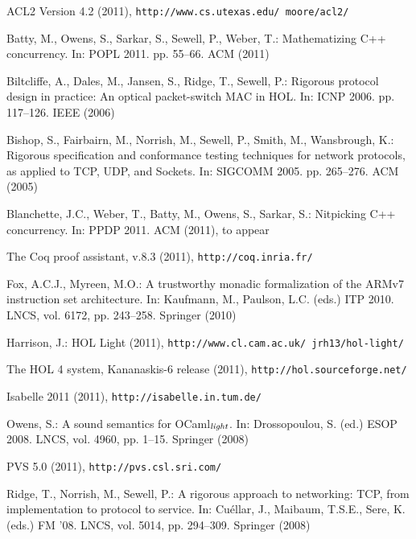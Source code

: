 \documentclass[a4paper]{llncs}
\begin{document}
\vspace*{-3mm}


%
%

\begin{thebibliography}{10}
\providecommand{\url}[1]{\texttt{#1}}
\providecommand{\urlprefix}{URL }

{ACL2 Version 4.2} (2011), \url{http://www.cs.utexas.edu/~moore/acl2/}

Batty, M., Owens, S., Sarkar, S., Sewell, P., Weber, T.: Mathematizing {C++}
  concurrency. In: POPL 2011. pp. 55--66. ACM (2011)

Biltcliffe, A., Dales, M., Jansen, S., Ridge, T., Sewell, P.: Rigorous protocol
  design in practice: An optical packet-switch {MAC} in {HOL}. In: ICNP 2006.
  pp. 117--126. IEEE (2006)

Bishop, S., Fairbairn, M., Norrish, M., Sewell, P., Smith, M., Wansbrough, K.:
  Rigorous specification and conformance testing techniques for network
  protocols, as applied to {TCP}, {UDP}, and {S}ockets. In: SIGCOMM 2005. pp.
  265--276. ACM (2005)

Blanchette, J.C., Weber, T., Batty, M., Owens, S., Sarkar, S.: Nitpicking {C++}
  concurrency. In: PPDP 2011. ACM (2011), to appear

The {C}oq proof assistant, v.8.3 (2011), \url{http://coq.inria.fr/}

Fox, A.C.J., Myreen, M.O.: A trustworthy monadic formalization of the {ARMv7}
  instruction set architecture. In: Kaufmann, M., Paulson, L.C. (eds.) ITP
  2010. LNCS, vol. 6172, pp. 243--258. Springer (2010)

Harrison, J.: {HOL Light} (2011),
  \url{http://www.cl.cam.ac.uk/~jrh13/hol-light/}

The {HOL 4} system, {K}ananaskis-6 release (2011),
  \url{http://hol.sourceforge.net/}

Isabelle 2011 (2011), \url{http://isabelle.in.tum.de/}

Owens, S.: A sound semantics for {OCaml$_{\emph{light}}$}. In: Drossopoulou, S.
  (ed.) ESOP 2008. LNCS, vol. 4960, pp. 1--15. Springer (2008)

{PVS 5.0} (2011), \url{http://pvs.csl.sri.com/}

Ridge, T., Norrish, M., Sewell, P.: A rigorous approach to networking: {TCP},
  from implementation to protocol to service. In: Cu{\'e}llar, J., Maibaum,
  T.S.E., Sere, K. (eds.) FM '08. LNCS, vol. 5014, pp. 294--309. Springer
  (2008)


\end{thebibliography}
\end{document}
